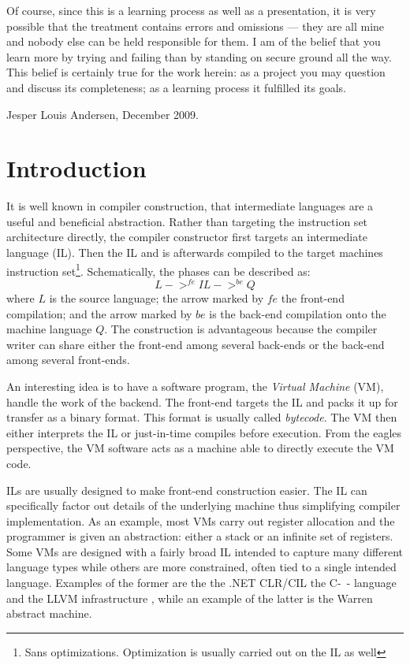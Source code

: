 \documentclass[a4paper, oneside, 10pt, final]{memoir}
\begin{document}
Of course, since this is a learning process as well as a presentation,
it is very possible that the treatment contains errors and omissions
--- they are all mine and nobody else can be held responsible for
them. I am of the belief that you learn more by trying and failing
than by standing on secure ground all the way. This belief is
certainly true for the work herein: as a project you may question and
discuss its completeness; as a learning process it fulfilled
its goals.\\

\begin{flushright}
  Jesper Louis Andersen, December 2009.
\end{flushright}

\newpage{}
\chapter{Introduction}
\newcommand{\dom}[1]{\mathrm{dom}(#1)}
\newcommand{\lbl}[1]{l[#1]}
\newcommand{\lblp}[1]{l'[#1]}
It is well known in compiler construction, that intermediate languages
are a useful and beneficial abstraction\cite{appel:1998:modern,
  mogensen:2008:basics}. Rather than targeting the instruction set
architecture directly, the compiler constructor first targets an
intermediate language (IL). Then the IL and is afterwards compiled to
the target machines instruction set\footnote{Sans
  optimizations. Optimization is usually carried out on the IL as
  well}. Schematically, the phases can be described as:
\begin{equation*}
  L ->^{fe} IL ->^{be} Q
\end{equation*}
where $L$ is the source language; the arrow marked by $fe$ the
front-end compilation; and the arrow marked by $be$ is the back-end
compilation onto the machine language $Q$. The construction is
advantageous because the compiler writer can share either the
front-end among several back-ends or the back-end among several
front-ends.

An interesting idea is to have a software program, the \emph{Virtual
  Machine} (VM), handle the work of the backend. The front-end
targets the IL and packs it up for transfer as a binary format. This
format is usually called \emph{bytecode}. The VM then either
interprets the IL or just-in-time compiles before execution. From the
eagles perspective, the VM software acts as a machine able to directly
execute the VM code.

ILs are usually designed to make front-end construction easier. The IL
can specifically factor out details of the underlying machine thus
simplifying compiler implementation. As an example, most VMs carry out
register allocation and the programmer is given an abstraction: either
a stack or an infinite set of registers. Some VMs are designed with a
fairly broad IL intended to capture many different language types
while others are more constrained, often tied to a single intended
language. Examples of the former are the the .NET
CLR/CIL\cite{ecma:2006:335} the C-\ - language\cite{http:cminmin} and
the LLVM infrastructure \cite{lattner.ea:2009:llvm-ref}, while an
example of the latter is the Warren abstract
machine\cite{warren:1983:prolog}.
\end{document}
